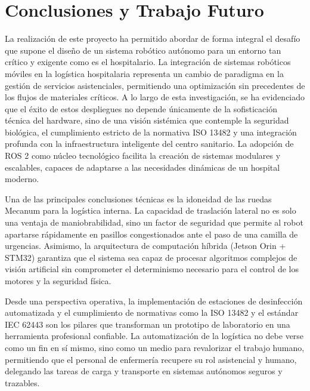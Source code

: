 \section{Conclusiones y Trabajo Futuro}
La realización de este proyecto ha permitido abordar de forma integral el desafío que supone el diseño de un sistema robótico autónomo para un entorno tan crítico y exigente como es el hospitalario. La integración de sistemas robóticos móviles en la logística hospitalaria representa un cambio de paradigma en la gestión de servicios asistenciales, permitiendo una optimización sin precedentes de los flujos de materiales críticos. A lo largo de esta investigación, se ha evidenciado que el éxito de estos despliegues no depende únicamente de la sofisticación técnica del hardware, sino de una visión sistémica que contemple la seguridad biológica, el cumplimiento estricto de la normativa ISO 13482 y una integración profunda con la infraestructura inteligente del centro sanitario. La adopción de ROS 2 como núcleo tecnológico facilita la creación de sistemas modulares y escalables, capaces de adaptarse a las necesidades dinámicas de un hospital moderno.

Una de las principales conclusiones técnicas es la idoneidad de las ruedas Mecanum para la logística interna. La capacidad de traslación lateral no es solo una ventaja de maniobrabilidad, sino un factor de seguridad que permite al robot apartarse rápidamente en pasillos congestionados ante el paso de una camilla de urgencias. Asimismo, la arquitectura de computación híbrida (Jetson Orin + STM32) garantiza que el sistema sea capaz de procesar algoritmos complejos de visión artificial sin comprometer el determinismo necesario para el control de los motores y la seguridad física.

Desde una perspectiva operativa, la implementación de estaciones de desinfección automatizada y el cumplimiento de normativas como la ISO 13482 y el estándar IEC 62443 son los pilares que transforman un prototipo de laboratorio en una herramienta profesional confiable. La automatización de la logística no debe verse como un fin en sí mismo, sino como un medio para revalorizar el trabajo humano, permitiendo que el personal de enfermería recupere su rol asistencial y humano, delegando las tareas de carga y transporte en sistemas autónomos seguros y trazables.

